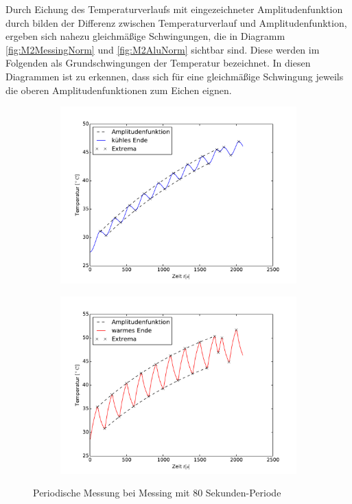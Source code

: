 Durch Eichung des Temperaturverlaufs mit eingezeichneter Amplitudenfunktion durch bilden der Differenz zwischen Temperaturverlauf und Amplitudenfunktion, ergeben sich nahezu gleichmäßige Schwingungen, die in Diagramm \ref{fig:M2MessingNorm} und \ref{fig:M2AluNorm} sichtbar sind. 
Diese werden im Folgenden als Grundschwingungen der Temperatur bezeichnet. 
In diesen Diagrammen ist zu erkennen, dass sich für eine gleichmäßige Schwingung jeweils die oberen Amplitudenfunktionen zum Eichen eignen.
\begin{figure}[h!]
	\centering
	\begin{subfigure}{0.9\textwidth}
	\includegraphics[width=\textwidth]{Bilder/M2_Messing_kuehl.pdf}
	\end{subfigure}
	\begin{subfigure}{0.9\textwidth}
	\includegraphics[width=\textwidth]{Bilder/M2_Messing_warm.pdf}
	\end{subfigure}
	\caption{Periodische Messung bei Messing mit 80 Sekunden-Periode}
	\label{fig:M2Messing}
\end{figure}
